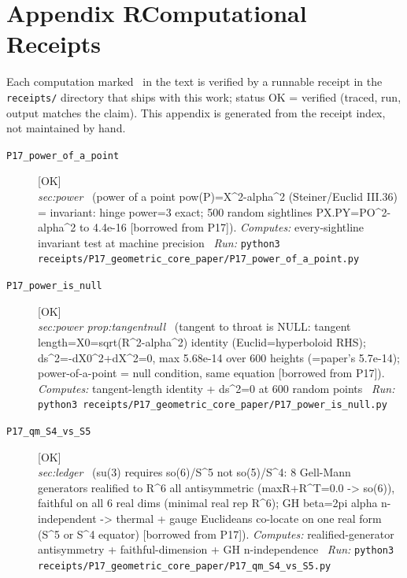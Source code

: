 \clearpage
\section*{Appendix R\quad Computational Receipts}\label{app:receipts}
\small\noindent Each computation marked \rcptmarker\ in the text is verified by a runnable receipt in the \texttt{receipts/} directory that ships with this work; status \textsf{OK} = verified (traced, run, output matches the claim). This appendix is generated from the receipt index, not maintained by hand.\par\medskip
\begingroup\renewcommand{\arraystretch}{1.25}
\begin{description}
\item[\label{rcpt:P17_power_of_a_point}\texttt{P17\_power\_of\_a\_point}]\hfill\textsf{[OK]}\\
\textit{sec:power} \ (power of a point pow(P)=\textbar{}X\textbar{}\textasciicircum{}2-alpha\textasciicircum{}2 (Steiner/Euclid III.36) = invariant: hinge power=3 exact; 500 random sightlines PX.PY=\textbar{}PO\textbar{}\textasciicircum{}2-alpha\textasciicircum{}2 to 4.4e-16 [borrowed from P17]). 
\emph{Computes:} every-sightline invariant test at machine precision
\ \emph{Run:} \texttt{python3 receipts/P17\_geometric\_core\_paper/P17\_power\_of\_a\_point.py}
\item[\label{rcpt:P17_power_is_null}\texttt{P17\_power\_is\_null}]\hfill\textsf{[OK]}\\
\textit{sec:power prop:tangentnull} \ (tangent to throat is NULL: tangent length=\textbar{}X0\textbar{}=sqrt(R\textasciicircum{}2-alpha\textasciicircum{}2) identity (Euclid=hyperboloid RHS); ds\textasciicircum{}2=-dX0\textasciicircum{}2+\textbar{}dX\textbar{}\textasciicircum{}2=0, max 5.68e-14 over 600 heights (=paper's 5.7e-14); power-of-a-point = null condition, same equation [borrowed from P17]). 
\emph{Computes:} tangent-length identity + ds\textasciicircum{}2=0 at 600 random points
\ \emph{Run:} \texttt{python3 receipts/P17\_geometric\_core\_paper/P17\_power\_is\_null.py}
\item[\label{rcpt:P17_qm_S4_vs_S5}\texttt{P17\_qm\_S4\_vs\_S5}]\hfill\textsf{[OK]}\\
\textit{sec:ledger} \ (su(3) requires so(6)/S\textasciicircum{}5 not so(5)/S\textasciicircum{}4: 8 Gell-Mann generators realified to R\textasciicircum{}6 all antisymmetric (max\textbar{}R+R\textasciicircum{}T\textbar{}=0.0 -> so(6)), faithful on all 6 real dims (minimal real rep R\textasciicircum{}6); GH beta=2pi alpha n-independent -> thermal + gauge Euclideans co-locate on one real form (S\textasciicircum{}5 or S\textasciicircum{}4 equator) [borrowed from P17]). 
\emph{Computes:} realified-generator antisymmetry + faithful-dimension + GH n-independence
\ \emph{Run:} \texttt{python3 receipts/P17\_geometric\_core\_paper/P17\_qm\_S4\_vs\_S5.py}
\end{description}\endgroup
